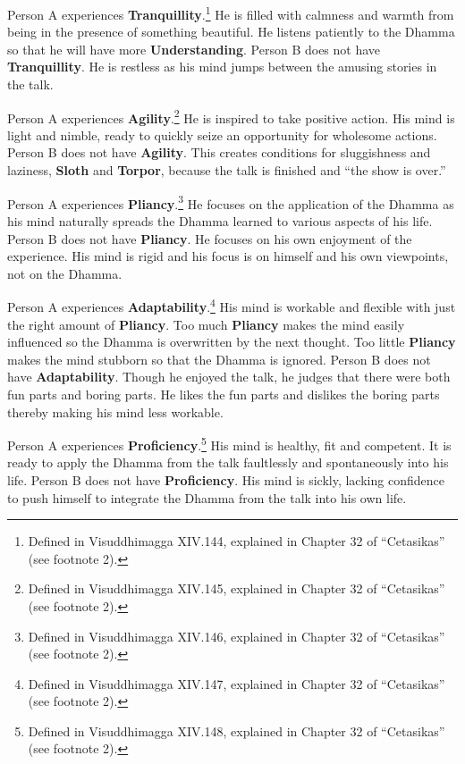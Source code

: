 Person A experiences \textbf{Tranquillity}.\footnote{Defined in Visuddhimagga XIV.144, explained in Chapter 32 of “Cetasikas” (see footnote 2).} He is filled with calmness and warmth from being in the presence of something beautiful. He listens patiently to the Dhamma so that he will have more \textbf{Understanding}. Person B does not have \textbf{Tranquillity}. He is restless as his mind jumps between the amusing stories in the talk.

Person A experiences \textbf{Agility}.\footnote{Defined in Visuddhimagga XIV.145, explained in Chapter 32 of “Cetasikas” (see footnote 2).} He is inspired to take positive action. His mind is light and nimble, ready to quickly seize an opportunity for wholesome actions. Person B does not have \textbf{Agility}. This creates conditions for sluggishness and laziness, \textbf{Sloth} and \textbf{Torpor}, because the talk is finished and “the show is over.”

Person A experiences \textbf{Pliancy}.\footnote{Defined in Visuddhimagga XIV.146, explained in Chapter 32 of “Cetasikas” (see footnote 2).} He focuses on the application of the Dhamma as his mind naturally spreads the Dhamma learned to various aspects of his life. Person B does not have \textbf{Pliancy}. He focuses on his own enjoyment of the experience. His mind is rigid and his focus is on himself and his own viewpoints, not on the Dhamma.

Person A experiences \textbf{Adaptability}.\footnote{Defined in Visuddhimagga XIV.147, explained in Chapter 32 of “Cetasikas” (see footnote 2).} His mind is workable and flexible with just the right amount of \textbf{Pliancy}. Too much \textbf{Pliancy} makes the mind easily influenced so the Dhamma is overwritten by the next thought. Too little \textbf{Pliancy} makes the mind stubborn so that the Dhamma is ignored. Person B does not have \textbf{Adaptability}. Though he enjoyed the talk, he judges that there were both fun parts and boring parts. He likes the fun parts and dislikes the boring parts thereby making his mind less workable.

Person A experiences \textbf{Proficiency}.\footnote{Defined in Visuddhimagga XIV.148, explained in Chapter 32 of “Cetasikas” (see footnote 2).} His mind is healthy, fit and competent. It is ready to apply the Dhamma from the talk faultlessly and spontaneously into his life. Person B does not have \textbf{Proficiency}. His mind is sickly, lacking confidence to push himself to integrate the Dhamma from the talk into his own life.

